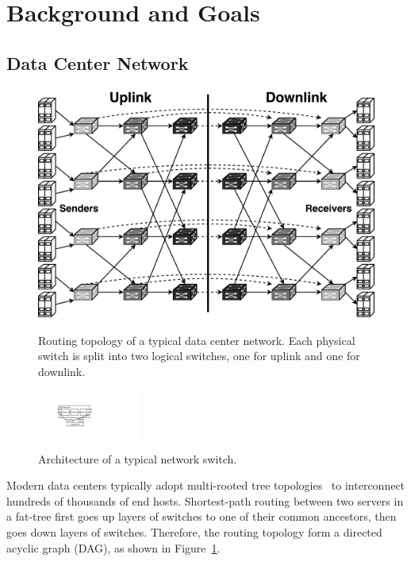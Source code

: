 \section{Background and Goals}
\label{sec:background}


\subsection{Data Center Network}
\label{sec:dcn}




\begin{figure}[t]
\centering
{\includegraphics[width=.48\textwidth]{images/dcn_dag.pdf}}
\caption{
	Routing topology of a typical data center network.
	Each physical switch is split into two logical switches, one for uplink and one for downlink.
}
\label{fig:dcn}
\vspace{-1.5em}
\end{figure}

\begin{figure}[t]
\centering
\includegraphics[width=0.3\textwidth]{images/cropped_switch_architecture.pdf}
\caption{Architecture of a typical network switch.}
\label{fig:switch}
\vspace{-1.5em}
\end{figure}

Modern data centers typically adopt multi-rooted tree topologies~\cite{leiserson1985fat,greenberg2009vl2} to interconnect hundreds of thousands of end hosts.
Shortest-path routing between two servers in a fat-tree first goes up layers of switches to one of their common ancestors, then goes down layers of switches.
Therefore, the routing topology form a directed acyclic graph (DAG), as shown in Figure~\ref{fig:dcn}.


